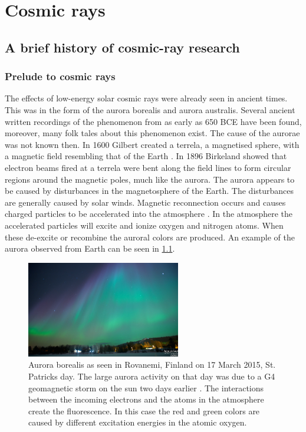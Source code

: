 \chapter{Cosmic rays}
\label{ch:cosmic-rays}


\section{A brief history of cosmic-ray research}


\subsection{Prelude to cosmic rays}

The effects of low-energy solar cosmic rays were already seen in ancient times. This was in the form of the aurora borealis and aurora australis. Several ancient written recordings of the phenomenon from as early as 650 BCE \cite{stephenson2004aurora} have been found, moreover, many folk tales about this phenomenon exist. The cause of the aurorae was not known then. In 1600 Gilbert created a terrela, a magnetised sphere, with a magnetic field resembling that of the Earth \cite{gilbert1893terrella}. In 1896 Birkeland \cite{lilensten2012terrella} showed that electron beams fired at a terrela were bent along the field lines to form circular regions around the magnetic poles, much like the aurora. The aurora appears to be caused by disturbances in the magnetosphere of the Earth. The disturbances are generally caused by solar winds. Magnetic reconnection occurs and causes charged particles to be accelerated into the atmosphere \cite{angelopoulos2008reconnection}. In the atmosphere the accelerated particles will excite and ionize oxygen and nitrogen atoms. When these de-excite or recombine the auroral colors are produced. An example of the aurora observed from Earth can be seen in \cref{fig:aurora}.

\begin{figure}
    \centering
    \includegraphics[width=0.6\textwidth]{plots/cosmic-rays/aurora.png}
    \caption{Aurora borealis as seen in Rovanemi, Finland on 17 March 2015, St. Patricks day. The large aurora activity on that day was due to a G4 geomagnetic storm on the sun two days earlier \cite{swpc2015stpatrick}. The interactions between the incoming electrons and the atoms in the atmosphere create the fluorescence. In this case the red and green colors are caused by different excitation energies in the atomic oxygen.}
    \label{fig:aurora}
\end{figure}


